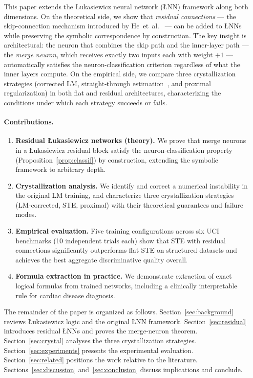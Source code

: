 \documentclass[lettersize,journal]{IEEEtran}
\newcommand{\LNN}{\L{}NN}
\begin{document}
This paper extends the \L{}ukasiewicz neural network (\LNN{}) framework along
both dimensions.
On the theoretical side, we show that \emph{residual connections}
--- the skip-connection mechanism introduced by He~et~al.~\cite{he2016} ---
can be added to \LNN{}s while preserving the symbolic correspondence by
construction.
The key insight is architectural: the neuron that combines the skip path and
the inner-layer path --- the \emph{merge neuron}, which receives exactly two
inputs each with weight $+1$ --- automatically satisfies the
neuron-classification criterion regardless of what the inner layers compute.
On the empirical side, we compare three crystallization strategies (corrected
LM, straight-through estimation~\cite{bengio2013}, and proximal regularization)
in both flat and residual architectures, characterizing the conditions under
which each strategy succeeds or fails.

\paragraph{Contributions.}
\begin{enumerate}
  \item \textbf{Residual \L{}ukasiewicz networks (theory).}
    We prove that merge neurons in a \L{}ukasiewicz residual block satisfy
    the neuron-classification property (Proposition~\ref{prop:classif}) by
    construction, extending the symbolic framework to arbitrary depth.
  \item \textbf{Crystallization analysis.}
    We identify and correct a numerical instability in the original LM
    training, and characterize three crystallization strategies (LM-corrected,
    STE, proximal) with their theoretical guarantees and failure modes.
  \item \textbf{Empirical evaluation.}
    Five training configurations across six UCI benchmarks (10 independent
    trials each) show that STE with residual connections significantly
    outperforms flat STE on structured datasets and achieves the best
    aggregate discriminative quality overall.
  \item \textbf{Formula extraction in practice.}
    We demonstrate extraction of exact logical formulas from trained networks,
    including a clinically interpretable rule for cardiac disease diagnosis.
\end{enumerate}

The remainder of the paper is organized as follows.
Section~\ref{sec:background} reviews \L{}ukasiewicz logic and the original
\LNN{} framework.
Section~\ref{sec:residual} introduces residual \LNN{}s and proves the
merge-neuron theorem.
Section~\ref{sec:crystal} analyses the three crystallization strategies.
Section~\ref{sec:experiments} presents the experimental evaluation.
Section~\ref{sec:related} positions the work relative to the literature.
Sections~\ref{sec:discussion} and~\ref{sec:conclusion} discuss implications
and conclude.
\end{document}
